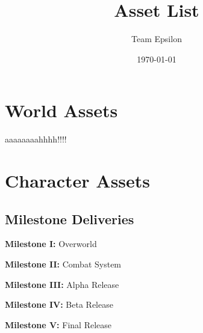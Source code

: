 \documentclass[12pt,titlepage]{article}
\title{Asset List}
\author{Team Epsilon}
\date{\today}
\begin{document}
\maketitle

\section{World Assets}
    \begin{todolist}
        \item aaaaaaaahhhh!!!!
    \end{todolist}
\section{Character Assets}

     \begin{todolist}
        \item 
        \item 
        \item 
        \item 
    \end{todolist}

\subsection{Milestone Deliveries}
\begin{todolist}
    \item \textbf{Milestone I:} Overworld
    \item \textbf{Milestone II:} Combat System
    \item \textbf{Milestone III:} Alpha Release
    \item \textbf{Milestone IV:} Beta Release
    \item \textbf{Milestone V:} Final Release
\end{todolist}
\end{document}
